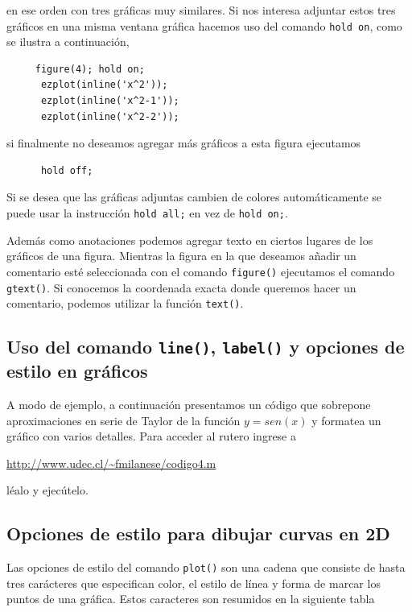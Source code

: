 \documentclass[11pt]{article}
\begin{document}
     en ese orden con tres gr\'aficas muy similares.
     Si nos interesa adjuntar estos tres gr\'aficos en una misma ventana gr\'afica hacemos uso del 
     comando \texttt{hold on}, como se ilustra a continuaci\'on,
     \begin{verbatim}
     figure(4); hold on;
      ezplot(inline('x^2'));
      ezplot(inline('x^2-1'));
      ezplot(inline('x^2-2'));
     \end{verbatim}
     si finalmente no deseamos agregar m\'as gr\'aficos a esta figura ejecutamos 
     \begin{verbatim}
      hold off;
     \end{verbatim}  
     Si se desea que las gr\'aficas adjuntas cambien de colores autom\'aticamente se puede usar la instrucci\'on \texttt{hold all;} en vez de \texttt{hold on;}.
     
     Adem\'as como anotaciones podemos agregar texto en ciertos lugares de los gr\'aficos de una figura. Mientras 
     la figura en la que deseamos añadir un comentario est\'e seleccionada con el comando \texttt{figure()} ejecutamos el 
     comando \texttt{gtext()}. Si conocemos la coordenada exacta donde queremos hacer un comentario, podemos 
     utilizar la funci\'on \texttt{text()}.
     
     \subsection{Uso del comando \texttt{line()}, \texttt{label()} y opciones de estilo en gr\'aficos}
     
     A modo de ejemplo, a continuaci\'on presentamos un c\'odigo que sobrepone aproximaciones 
     en serie de Taylor de la funci\'on $y=sen(x)$ y formatea un gr\'afico con varios detalles.
     Para acceder al rutero ingrese a

     \url{http://www.udec.cl/~fmilanese/codigo4.m}
     
      l\'ealo y ejec\'utelo.
      
      \subsection{Opciones de estilo para dibujar curvas en 2D}

      Las opciones de estilo del comando \texttt{plot()} son una cadena que consiste de hasta tres 
      car\'acteres que especifican color, el estilo de l\'inea y forma de marcar los puntos de una gr\'afica.
      Estos caracteres son resumidos en la siguiente tabla
      
\end{document}
